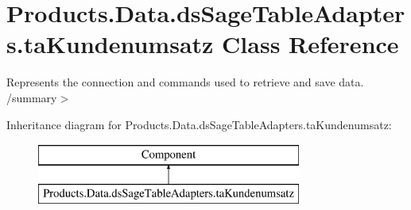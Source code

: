 \hypertarget{class_products_1_1_data_1_1ds_sage_table_adapters_1_1ta_kundenumsatz}{}\section{Products.\+Data.\+ds\+Sage\+Table\+Adapters.\+ta\+Kundenumsatz Class Reference}
\label{class_products_1_1_data_1_1ds_sage_table_adapters_1_1ta_kundenumsatz}


Represents the connection and commands used to retrieve and save data. /summary$>$  


Inheritance diagram for Products.\+Data.\+ds\+Sage\+Table\+Adapters.\+ta\+Kundenumsatz\+:\begin{figure}[H]
\begin{center}
\leavevmode
\includegraphics[height=2.000000cm]{class_products_1_1_data_1_1ds_sage_table_adapters_1_1ta_kundenumsatz}
\end{center}
\end{figure}
